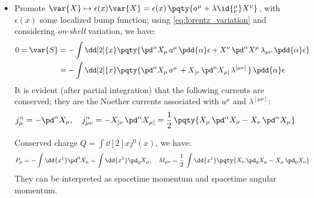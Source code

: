 \documentclass[a4paper,10pt]{article}
\begin{document}
\begin{itemize}
	\item Promote $
		\var{X}\mapsto \epsilon(x)\var{X}
		= \epsilon(x)\,\pqty{
			a^\mu + \lambda\id{^\mu_\nu} X^\nu
		}
	$, with $\epsilon(x)$ some localized bump function; using \eqref{eq:lorentz_variation} and considering \textit{on-shell} variation, we have:
	\begin{equation}
	\begin{aligned}
		0 = \var{S}
		&= - \int \dd[2]{x} \pqty{
			\pd^\alpha X_\mu\,
				a^\mu\,
				\pdd{\alpha}\epsilon
			+ X^\nu\,\pd^\alpha X^\mu\,
				\lambda_{\mu\nu}\,
				\pdd{\alpha}\epsilon
		} \\
		&= - \int \dd[2]{x} \pqty{
			\pd^\alpha X_\mu\,
				a^\mu\,
			+ X_{[\nu}\,\pd^\alpha X_{\mu]}\,
				\lambda^{[\mu\nu]}\,
		}\,\pdd{\alpha}\epsilon
	\end{aligned}
	\end{equation}
	It is evident (after partial integration) that the following currents are conserved; they are the Noether currents associated with $a^\mu$ and $\lambda^{[\mu\nu]}$:
	\begin{equation}
		j^\alpha_\mu
		= -\pd^\alpha X_\mu,\quad
		j^\alpha_{\mu\nu}
		= -X_{[\nu}\,\pd^\alpha X_{\mu]}
		= \frac{1}{2}\,\pqty{
			X_\mu\,\pd^\alpha X_\nu
			- X_\nu\,\pd^\alpha X_\mu
		}
	\end{equation}
	
	Conserved charge $
		Q = \int\dd[2]{x} j^0(x)
	$, we have:
	\begin{equation}
		P_\mu = - \int\dd{x^1} \pd^0 X_\mu
		= \int\dd{x^1} \pd_0 X_\mu,\quad
		M_{\mu\nu}
		= \frac{1}{2}\,\int\dd{x^1}\pqty{
			X_\nu\,\pd_0 X_\mu
			- X_\mu\,\pd_0 X_\nu
		}
	\end{equation}
	They can be interpreted as spacetime momentum and spacetime angular momentum. 
	\qedfull
	\end{itemize}
\end{document}
